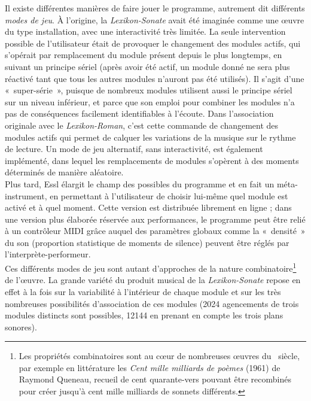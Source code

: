 \documentclass[a4paper,12pt]{article}
\newcommand{\guill}[1]{«~#1~»}
\begin{document}
Il existe différentes manières de faire jouer le programme, autrement dit différents \emph{modes de jeu}. À l'origine, la \emph{Lexikon-Sonate} avait été imaginée comme une œuvre du type installation, avec une interactivité très limitée. La seule intervention possible de l'utilisateur était de provoquer le changement des modules actifs, qui s'opérait par remplacement du module présent depuis le plus longtemps, en suivant un principe sériel (après avoir été actif, un module donné ne sera plus réactivé tant que tous les autres modules n'auront pas été utilisés). Il s'agit d'une \guill{super-série}, puisque de nombreux modules utilisent aussi le principe sériel sur un niveau inférieur, et parce que son emploi pour combiner les modules n'a pas de conséquences facilement identifiables à l'écoute. Dans l'association originale avec le \emph{Lexikon-Roman}, c'est cette commande de changement des modules actifs qui permet de calquer les variations de la musique sur le rythme de lecture. Un mode de jeu alternatif, sans interactivité, est également implémenté, dans lequel les remplacements de modules s'opèrent à des moments déterminés de manière aléatoire.\\
Plus tard, Essl élargit le champ des possibles du programme et en fait un méta-instrument, en permettant à l'utilisateur de choisir lui-même quel module est activé et à quel moment. Cette version est distribuée librement en ligne ; dans une version plus élaborée réservée aux performances, le programme peut être relié à un contrôleur MIDI grâce auquel des paramètres globaux comme la \guill{densité} du son (proportion statistique de moments de silence) peuvent être réglés par l'interprète-performeur.\\
Ces différents modes de jeu sont autant d'approches de la nature combinatoire\footnote{Les propriétés combinatoires sont au cœur de nombreuses œuvres du \XXe~siècle, par exemple en littérature les \emph{Cent mille milliards de poèmes} (1961) de Raymond Queneau, recueil de cent quarante-vers pouvant être recombinés pour créer jusqu'à cent mille milliards de sonnets différents.} de l'œuvre. La grande variété du produit musical de la \emph{Lexikon-Sonate} repose en effet à la fois sur la variabilité à l'intérieur de chaque module et sur les très nombreuses possibilités d'association de ces modules (2024 agencements de trois modules distincts sont possibles, 12144 en prenant en compte les trois plans sonores).
\end{document}
